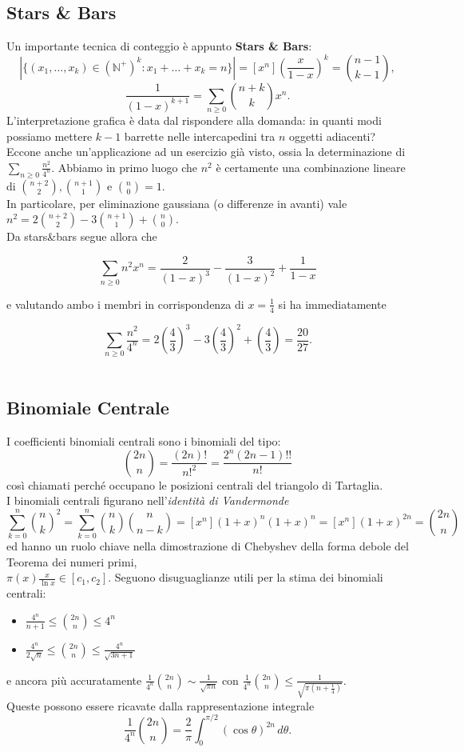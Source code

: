 \documentclass[a4paper,twoside]{article}
\newcommand{\N}{\mathbb{N}}
\theoremstyle{definition}
\numberwithin{theorem}{section}
\begin{document}
\subsection{Stars \& Bars}
Un importante tecnica di conteggio è appunto \textbf{Stars \& Bars}:
$$\left|\{(x_1,\ldots,x_k)\in(\N^+)^k: x_1+\ldots+x_k = n\}\right|=[x^n]\left(\frac{x}{1-x}\right)^k = \binom{n-1}{k-1},$$
$$ \frac{1}{(1-x)^{k+1}}=\sum_{n\geq 0}\binom{n+k}{k}x^n. $$
L'interpretazione grafica è data dal rispondere alla domanda: in quanti modi possiamo mettere $k-1$ barrette nelle intercapedini tra $n$ oggetti adiacenti? Eccone anche un'applicazione ad un esercizio già visto, ossia la determinazione di $\sum_{n\geq 0}\frac{n^2}{4^n}$. Abbiamo in primo luogo che $n^2$ è certamente una combinazione lineare di $\binom{n+2}{2},\binom{n+1}{1}$ e $\binom{n}{0}=1$.\\ In particolare, per eliminazione gaussiana (o differenze in avanti) vale $n^2=2\binom{n+2}{2}-3\binom{n+1}{1}+\binom{n}{0}$.\\ Da stars\&bars segue allora che 

$$ \sum_{n\geq 0} n^2 x^n = \frac{2}{(1-x)^3}-\frac{3}{(1-x)^2}+\frac{1}{1-x} $$

e valutando ambo i membri in corrispondenza di $x=\frac{1}{4}$ si ha immediatamente 

$$ \sum_{n\geq 0}\frac{n^2}{4^n} = 2\left(\frac{4}{3}\right)^3-3\left(\frac{4}{3}\right)^2+\left(\frac{4}{3}\right)=\frac{20}{27}.$$
\\

\subsection{Binomiale Centrale}
I coefficienti binomiali centrali sono i binomiali del tipo:
$$\binom{2n}{n}=\frac{(2n)!}{n!^2}=\frac{2^n(2n-1)!!}{n!}$$
così chiamati perché occupano le posizioni centrali del triangolo di Tartaglia.\\ I binomiali centrali figurano nell'\emph{identità di Vandermonde}
$$ \sum_{k=0}^{n}\binom{n}{k}^2 = \sum_{k=0}^{n}\binom{n}{k}\binom{n}{n-k}=[x^n](1+x)^n (1+x)^n = [x^n](1+x)^{2n} = \binom{2n}{n} $$
ed hanno un ruolo chiave nella dimostrazione di Chebyshev della forma debole del Teorema dei numeri primi,\\ $\pi(x)\frac{x}{\ln x}\in [c_1,c_2]$. Seguono disuguaglianze utili per la stima dei binomiali centrali:
    \begin{itemize}
        \item $\frac{4^n}{n+1}\leq\binom{2n}{n}\leq4^n$
        \item $\frac{4^n}{2\sqrt{n}}\leq\binom{2n}{n}\leq\frac{4^n}{\sqrt{3n+1}}$
    \end{itemize}
e ancora più accuratamente $\frac{1}{4^n}\binom{2n}{n}\sim\frac{1}{\sqrt{\pi n}}$ con $\frac{1}{4^n}\binom{2n}{n}\leq \frac{1}{\sqrt{\pi\left(n+\frac{1}{4}\right)}}$.\\ Queste possono essere ricavate dalla rappresentazione integrale 
$$ \frac{1}{4^n}\binom{2n}{n} = \frac{2}{\pi}\int_{0}^{\pi/2}\left(\cos\theta\right)^{2n}\,d\theta. $$
    
\end{document}
